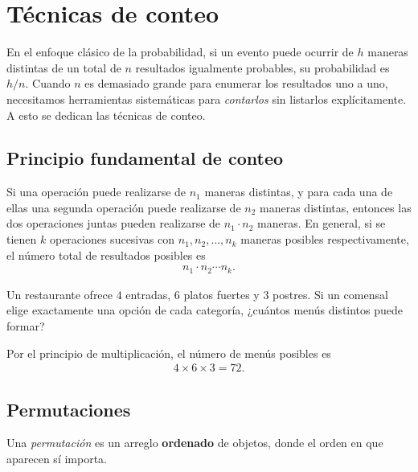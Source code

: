 \section{Técnicas de conteo}

En el enfoque clásico de la probabilidad, si un evento puede ocurrir de $h$ maneras distintas de un total de $n$ resultados igualmente probables, su probabilidad es $h/n$. Cuando $n$ es demasiado grande para enumerar los resultados uno a uno, necesitamos herramientas sistemáticas para \emph{contarlos} sin listarlos explícitamente. A esto se dedican las técnicas de conteo.

\subsection{Principio fundamental de conteo}

\begin{teorema}
	Si una operación puede realizarse de $n_1$ maneras distintas, y para cada una de ellas una segunda operación puede realizarse de $n_2$ maneras distintas, entonces las dos operaciones juntas pueden realizarse de $n_1 \cdot n_2$ maneras. En general, si se tienen $k$ operaciones sucesivas con $n_1, n_2, \ldots, n_k$ maneras posibles respectivamente, el número total de resultados posibles es
	\begin{align}
		\label{eq:conteo.1}
		n_1 \cdot n_2 \cdots n_k.
	\end{align}
\end{teorema}

\begin{ejemplo}
	\label{exmp:conteo.1}
	Un restaurante ofrece $4$ entradas, $6$ platos fuertes y $3$ postres. Si un comensal elige exactamente una opción de cada categoría, ¿cuántos menús distintos puede formar?
\end{ejemplo}

\begin{solucion}
	Por el principio de multiplicación, el número de menús posibles es
	\begin{align}
		4 \times 6 \times 3 = 72.
	\end{align}
\end{solucion}

\subsection{Permutaciones}

Una \emph{permutación} es un arreglo \textbf{ordenado} de objetos, donde el orden en que aparecen sí importa.

